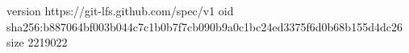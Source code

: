 version https://git-lfs.github.com/spec/v1
oid sha256:b887064bf003b044c7c1b0b7f7cb090b9a0c1bc24ed3375f6d0b68b155d4dc26
size 2219022
